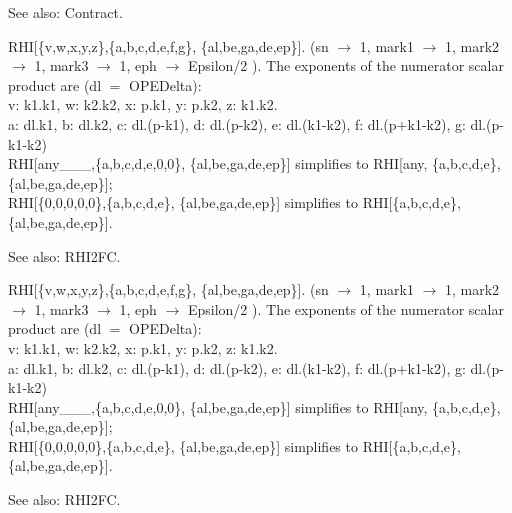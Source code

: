 See also:  Contract.



RHI[\{v,w,x,y,z\},\{a,b,c,d,e,f,g\}, \{al,be,ga,de,ep\}]. (sn \(\rightarrow \) 1, mark1 \(\rightarrow \) 1, mark2 \(\rightarrow \) 1,
  mark3 \(\rightarrow \) 1, eph \(\rightarrow \) Epsilon/2 ). The exponents of the numerator scalar product are (dl \(=\) OPEDelta): \\
v: k1.k1, w: k2.k2, { }x: p.k1, y: p.k2, z: k1.k2. \\
a: dl.k1, b: dl.k2, { }c: dl.(p-k1), d: dl.(p-k2), e: dl.(k1-k2), f: dl.(p\(+\)k1-k2), g: dl.(p-k1-k2) \\
RHI[any\_{}\_{}\_{},\{a,b,c,d,e,0,0\}, \{al,be,ga,de,ep\}] simplifies to { }RHI[any, \{a,b,c,d,e\}, \{al,be,ga,de,ep\}]; \\
RHI[\{0,0,0,0,0\},\{a,b,c,d,e\}, \{al,be,ga,de,ep\}] simplifies to { }RHI[\{a,b,c,d,e\}, \{al,be,ga,de,ep\}].

See also:  RHI2FC.





RHI[\{v,w,x,y,z\},\{a,b,c,d,e,f,g\}, \{al,be,ga,de,ep\}]. (sn \(\rightarrow \) 1, mark1 \(\rightarrow \) 1, mark2 \(\rightarrow \) 1,
  mark3 \(\rightarrow \) 1, eph \(\rightarrow \) Epsilon/2 ). The exponents of the numerator scalar product are (dl \(=\) OPEDelta): \\
v: k1.k1, w: k2.k2, { }x: p.k1, y: p.k2, z: k1.k2. \\
a: dl.k1, b: dl.k2, { }c: dl.(p-k1), d: dl.(p-k2), e: dl.(k1-k2), f: dl.(p\(+\)k1-k2), g: dl.(p-k1-k2) \\
RHI[any\_{}\_{}\_{},\{a,b,c,d,e,0,0\}, \{al,be,ga,de,ep\}] simplifies to { }RHI[any, \{a,b,c,d,e\}, \{al,be,ga,de,ep\}]; \\
RHI[\{0,0,0,0,0\},\{a,b,c,d,e\}, \{al,be,ga,de,ep\}] simplifies to { }RHI[\{a,b,c,d,e\}, \{al,be,ga,de,ep\}].

See also:  RHI2FC.





